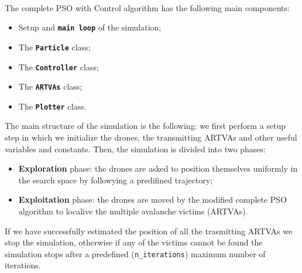 \noindent\\
The complete PSO with Control algorithm has the following main components: 
\begin{itemize}
    \item Setup and \textbf{\texttt{main loop}} of the simulation;
    \item The \textbf{\texttt{Particle}} class;
    \item The \textbf{\texttt{Controller}} class;
    \item The \textbf{\texttt{ARTVAs}} class;
    \item The \textbf{\texttt{Plotter}} class.
\end{itemize}
The main structure of the simulation is the following: 
we first perform a setup step in which we initialize the drones, 
the transmitting ARTVAs and other useful variables and constants.
Then, the simulation is divided into two phases:
\begin{itemize}
    \item \textbf{Exploration} phase: the drones are asked to position 
    themselves uniformly in the search space by followying a
    predifined trajectory;
    \item \textbf{Exploitation} phase: the drones are moved by the modified complete
    PSO algorithm to localive the multiple avalanche victims (ARTVAs).
\end{itemize}
If we have successfully estimated the position of all 
the trasmitting ARTVAs we stop the simulation, otherwise if any of the 
victims cannot be found the simulation stops after
a predefined (\texttt{n\_iterations}) maximum number of iterations.

